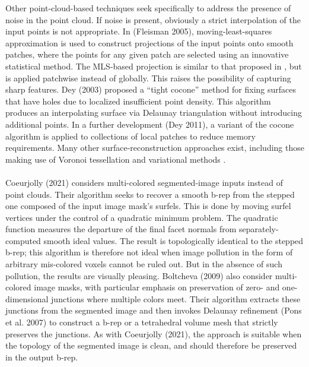 %
Other point-cloud-based techniques seek specifically to address the presence of noise in the point cloud.  If noise is present, obviously a strict interpolation of the input points is not appropriate.  In (Fleisman 2005), moving-least-squares approximation is used to construct projections of the input points onto smooth patches, where the points for any given patch are selected using an innovative statistical method.  The MLS-based projection is similar to that proposed in \cite{levin2004}, but is applied patchwise instead of globally.  This raises the possibility of capturing sharp features. Dey (2003) proposed a ``tight cocone'' method for fixing surfaces that have holes due to localized insufficient point density.  This algorithm produces an interpolating surface via Delaunay triangulation without introducing additional points.  In a further development (Dey 2011), a variant of the cocone algorithm is applied to collections of local patches to reduce memory requirements.  Many other surface-reconstruction approaches exist, including those making use of Voronoi tessellation and variational methods \cite{berger}. \\ \\
%
Coeurjolly (2021) considers multi-colored segmented-image inputs instead of point clouds.  Their algorithm seeks to recover a smooth b-rep from the stepped one composed of the input image mask's surfels.  This is done by moving surfel vertices under the control of a quadratic minimum problem.  The quadratic function measures the departure of the final facet normals from separately-computed smooth ideal values.  The result is topologically identical to the stepped b-rep; this algorithm is therefore not ideal when image pollution in the form of arbitrary mis-colored voxels cannot be ruled out.  But in the absence of such pollution, the results are visually pleasing.  Boltcheva (2009) also consider multi-colored image masks, with particular emphasis on preservation of zero- and one-dimensional junctions where multiple colors meet.  Their algorithm extracts these junctions from the segmented image and then invokes Delaunay refinement (Pons et al. 2007) to construct a b-rep or a tetrahedral volume mesh that strictly preserves the junctions.  As with Coeurjolly (2021), the approach is suitable when the topology of the segmented image is clean, and should therefore be preserved in the output b-rep. \\ \\
%
